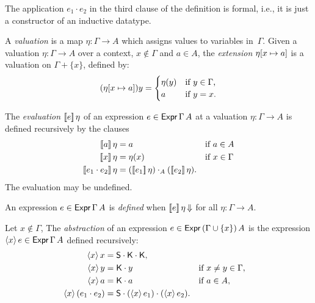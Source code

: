 \noindent
The application $e_1 \cdot e_2$ in the third clause of the definition is formal, i.e., it is just a constructor of an inductive datatype.

\begin{definition}
  \label{def:extension}%
  A \emph{valuation} is a map $\eta : \Gamma \to A$ which assigns values to variables in~$\Gamma$.
  Given a valuation $\eta : \Gamma \to A$ over a context, $x \not\in \Gamma$ and $a \in A$, the
  \emph{extension} $\eta[x \mapsto a]$ is a valuation on $\Gamma + \{x\}$, defined by:
  \begin{equation*}
    (\eta[x \mapsto a]) y =
    \begin{cases}
      \eta(y) &\text{if $y \in \Gamma$,}\\
      a       &\text{if $y = x$.}
    \end{cases}
  \end{equation*}
\end{definition}

\begin{definition}
  \label{def:evaluation}
  \leanok
  The \emph{evaluation} $[\![ e ]\!] \, \eta$ of an expression $e \in \mathsf{Expr}\,\Gamma\,A$ at a
  valuation $\eta : \Gamma \to A$ is defined recursively by the clauses
  \begin{align*}
    \eval{a}{\eta} &= a        &&\text{if $a \in A$}\\
    \eval{x}{\eta} &= \eta(x)  &&\text{if $x \in \Gamma$}\\
    \eval{e_1 \cdot e_2}{\eta} &= (\eval{e_1} \eta) \cdot_A (\eval{e_2} \eta).
  \end{align*}
  The evaluation may be undefined.
\end{definition}

\begin{definition}
  \label{def:expression-defined}
  \leanok
  An expression $e \in \mathsf{Expr}\,\Gamma\,A$ is \emph{defined} when $[\![ e ]\!] \, \eta\,{\Downarrow}$
  for all $\eta : \Gamma \to A$.
\end{definition}


\begin{definition}
  \label{def:abstraction}
  Let $x \not\in \Gamma$,
  The \emph{abstraction} of an expression $e \in \mathsf{Expr}\,(\Gamma \cup \{x\})\,A$ 
  is the expression $\langle x \rangle\, e \in \mathsf{Expr}\,\Gamma\,A$ defined recursively:
  \begin{align*}
    \langle x \rangle\, x &= \mathsf{S} \cdot \mathsf{K} \cdot \mathsf{K}, \\
    \langle x \rangle\, y &= \mathsf{K} \cdot y &&\text{if $x \neq y \in \Gamma$}, \\
    \langle x \rangle\, a &= \mathsf{K} \cdot a &&\text{if $a \in A$}, \\
    \langle x \rangle\, (e_1 \cdot e_2) &= \mathsf{S} \cdot (\langle x \rangle\, e_1) \cdot (\langle x \rangle\, e_2).
  \end{align*}
\end{definition}


